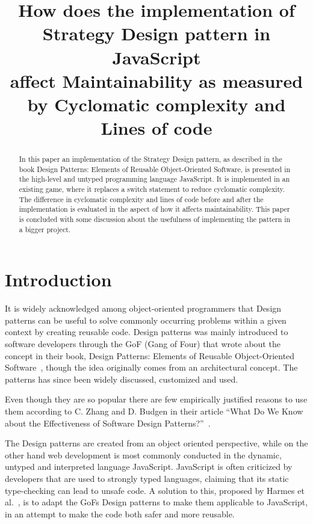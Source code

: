\documentclass[conference, a4paper]{IEEEtran}
\begin{document}
\title{How does the implementation of\\
Strategy Design pattern in JavaScript\\
affect Maintainability as measured by Cyclomatic complexity and Lines of code}
\author{
}

\maketitle

\begin{abstract}
	 In this paper an implementation of the Strategy Design pattern, as described in the book Design Patterns: Elements of Reusable Object-Oriented Software, is presented in the high-level and untyped programming language JavaScript. It is implemented in an existing game, where it replaces a switch statement to reduce cyclomatic complexity. The difference in cyclomatic complexity and lines of code before and after the implementation is evaluated in the aspect of how it affects maintainability. This paper is concluded with some discussion about the usefulness of implementing the pattern in a bigger project.
\end{abstract}

\section{Introduction}
\label{sec:Introduction}
It is widely acknowledged among object-oriented programmers that Design patterns can be useful to solve commonly occurring problems within a given context  by creating reusable code. Design patterns was mainly introduced to software developers through the GoF (Gang of Four) that wrote about the concept in their book, Design Patterns: Elements of Reusable Object-Oriented Software~\cite{bibitem:GoF}, though the idea originally comes from an architectural concept. The patterns has since been widely discussed, customized and used.

Even though they are so popular there are few empirically justified reasons to use them according to C. Zhang and D. Budgen in their article ``What Do We Know about the Effectiveness of Software Design Patterns?''~\cite{bibitem:Zhang}.

The Design patterns are created from an object oriented perspective, while on the other hand web development is most commonly conducted in the dynamic, untyped and interpreted language JavaScript. JavaScript is often criticized by developers that are used to strongly typed languages, claiming that its static type-checking can lead to unsafe code. A solution to this, proposed by Harmes et al.~\cite{bibitem:DiazHarmes}, is to adapt the GoFs Design patterns to make them applicable to JavaScript, in an attempt to make the code both safer and more reusable.
\end{document}
